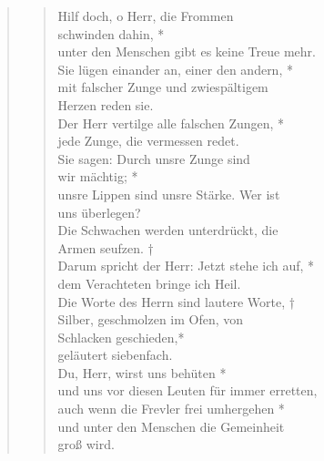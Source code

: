 \begin{quote}
\begin{verse}
Hilf doch, o Herr, die Frommen \\ schwinden dahin, *\\
unter den Menschen gibt es keine Treue mehr.\\ \vin
Sie lügen einander an, einer den andern, *\\ \vin
mit falscher Zunge und zwiespältigem \\ \vin  Herzen reden sie.\\
Der Herr vertilge alle falschen Zungen, *\\
jede Zunge, die vermessen redet.\\ \vin
Sie sagen: Durch unsre Zunge sind \\ \vin  wir mächtig; *\\ \vin
unsre Lippen sind unsre Stärke. Wer ist \\ \vin
 uns überlegen?\\
Die Schwachen werden unterdrückt, die \\ Armen seufzen. †\\
Darum spricht der Herr: Jetzt stehe ich auf, *\\ 
dem Verachteten bringe ich Heil.\\
\vin Die Worte des Herrn sind lautere Worte, †\\
\vin Silber, geschmolzen im Ofen, von \\ \vin Schlacken geschieden,*\\
\vin geläutert siebenfach.\\ 
Du, Herr, wirst uns behüten *\\
und uns vor  diesen Leuten 
für immer erretten,\\
\vin auch wenn die Frevler frei umhergehen *\\
\vin und unter den Menschen die Gemeinheit\\ \vin groß wird.\\

\end{verse}




\begin{verse}


\end{verse}
\end{quote}
